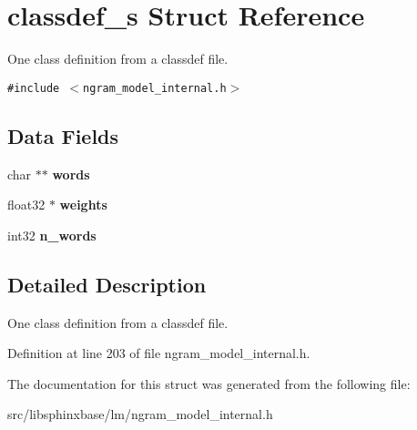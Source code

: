 \section{classdef\_\-s Struct Reference}
\label{structclassdef__s}
One class definition from a classdef file.  


{\tt \#include $<$ngram\_\-model\_\-internal.h$>$}

\subsection*{Data Fields}
\begin{CompactItemize}
\item 
char $\ast$$\ast$ \textbf{words}\label{structclassdef__s_9ebee54832926431cddd28f92f45479e}

\item 
float32 $\ast$ \textbf{weights}\label{structclassdef__s_85eed2992fbecae4c17d2c5c7dc7aa0f}

\item 
int32 \textbf{n\_\-words}\label{structclassdef__s_768a3dcf739a57c145c09b55a25c8a4a}

\end{CompactItemize}


\subsection{Detailed Description}
One class definition from a classdef file. 

Definition at line 203 of file ngram\_\-model\_\-internal.h.

The documentation for this struct was generated from the following file:\begin{CompactItemize}
\item 
src/libsphinxbase/lm/ngram\_\-model\_\-internal.h\end{CompactItemize}
